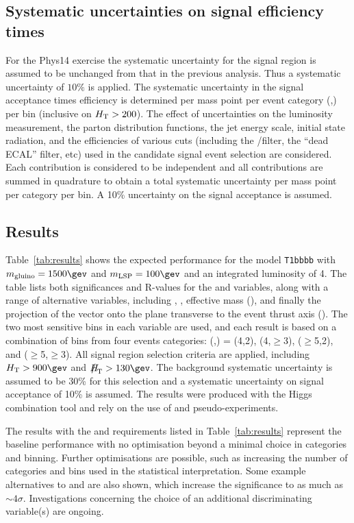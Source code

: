 \subsection{Systematic uncertainties on signal efficiency times}


For the Phys14 exercise the systematic uncertainty for the signal region 
is assumed to be unchanged from that in the previous analysis. 
Thus a systematic uncertainty of $10\%$ is applied. The systematic 
uncertainty in the signal acceptance times efficiency is determined per mass 
point per event category (\njet,\nb) per
\scalht bin (inclusive on $\mbox{$H_\text{T}$} > 200$). The effect of
uncertainties on the luminosity measurement, the parton distribution
functions, the jet energy scale, initial state radiation, and the
efficiencies of various cuts (including the \mht/\met filter, the
``dead ECAL'' filter, etc)
used in the candidate signal event selection are considered. Each
contribution is considered to be independent and all contributions are
summed in quadrature to obtain a total systematic uncertainty per mass
point per category per \scalht bin. A 10\% uncertainty on the signal
acceptance is assumed. 

\newpage

\subsection{Results}

Table~\ref{tab:results} shows the expected performance for the model
\verb!T1bbbb! with $m_{\rm gluino} = 1500\gev$ and $m_{\rm LSP} =
100\gev$ and an integrated luminosity of 4\fbinv. The table lists both
significances and R-values for the \scalht and \alphat variables,
along with a range of alternative variables, including \mht, \met,
effective mass (\meff), and finally the projection of the \mht vector
onto the plane transverse to the event thrust axis (\mhttt). The two
most sensitive bins in each variable are used, and each result is
based on a combination of bins from four events categories:
(\njet,\nb) = (4,2), (4,$\geq$3), ($\geq$5,2), and
($\geq$5,$\geq$3). All signal region selection criteria are applied,
including $\scalht > 900\gev$ and $\mht > 130\gev$. The background
systematic uncertainty is assumed to be 30\% for this selection and a
systematic uncertainty on signal acceptance of 10\% is assumed. The
results were produced with the Higgs combination tool and rely on the
use of \cls and pseudo-experiments.

The results with the \scalht and \alphat requirements listed in
Table~\ref{tab:results} represent the baseline performance with no
optimisation beyond a minimal choice in categories and
binning. Further optimisations are possible, such as increasing the
number of categories and bins used in the statistical
interpretation. Some example alternatives to \scalht and \alphat are
also shown, which increase the significance to as much as
$\sim4\sigma$. Investigations concerning the choice of an additional
discriminating variable(s) are ongoing.

